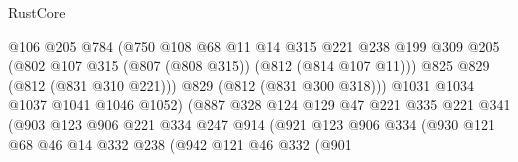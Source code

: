 \begin{lexlean}{RustCore}
\begin{coremodule}
                                      @106
                                      @205
                                      @784
                                      (@750
                                        @108
                                        @68
                                        @11
                                        @14
                                        @315
                                        @221
                                        @238
                                        @199
                                        @309
                                        @205
                                        (@802 @107 @315 (@807 (@808 @315)) (@812 (@814 @107 @11)))
                                        @825
                                        @829
                                        (@812 (@831 @310 @221)))
                                      @829
                                      (@812 (@831 @300 @318)))
                                    @1031
                                    @1034
                                    @1037
                                    @1041
                                    @1046
                                    @1052)
                                  (@887
                                    @328
                                    @124
                                    @129
                                    @47
                                    @221
                                    @335
                                    @221
                                    @341
                                    (@903
                                      @123
                                      @906
                                      @221
                                      @334
                                      @247
                                      @914
                                      (@921
                                        @123
                                        @906
                                        @334
                                        (@930
                                          @121
                                          @68
                                          @46
                                          @14
                                          @332
                                          @238
                                          (@942
                                            @121
                                            @46
                                            @332
                                            (@901

\end{coremodule}
\end{lexlean}
